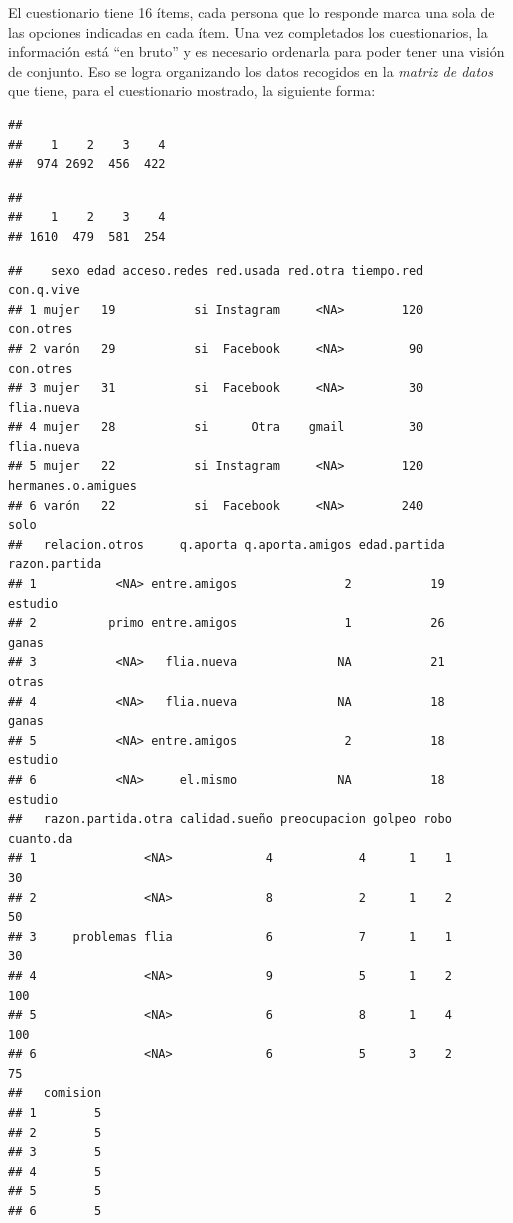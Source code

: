 \documentclass[]{book}
\begin{document}
El cuestionario tiene 16 ítems, cada persona que lo responde marca una sola de las opciones indicadas en cada ítem. Una vez completados los cuestionarios, la información está ``en bruto'' y es necesario ordenarla para poder tener una visión de conjunto. Eso se logra organizando los datos recogidos en la \emph{matriz de datos} que tiene, para el cuestionario mostrado, la siguiente forma:

\begin{verbatim}
## 
##    1    2    3    4 
##  974 2692  456  422
\end{verbatim}

\begin{verbatim}
## 
##    1    2    3    4 
## 1610  479  581  254
\end{verbatim}

\begin{verbatim}
##    sexo edad acceso.redes red.usada red.otra tiempo.red         con.q.vive
## 1 mujer   19           si Instagram     <NA>        120          con.otres
## 2 varón   29           si  Facebook     <NA>         90          con.otres
## 3 mujer   31           si  Facebook     <NA>         30         flia.nueva
## 4 mujer   28           si      Otra    gmail         30         flia.nueva
## 5 mujer   22           si Instagram     <NA>        120 hermanes.o.amigues
## 6 varón   22           si  Facebook     <NA>        240               solo
##   relacion.otros     q.aporta q.aporta.amigos edad.partida razon.partida
## 1           <NA> entre.amigos               2           19       estudio
## 2          primo entre.amigos               1           26         ganas
## 3           <NA>   flia.nueva              NA           21         otras
## 4           <NA>   flia.nueva              NA           18         ganas
## 5           <NA> entre.amigos               2           18       estudio
## 6           <NA>     el.mismo              NA           18       estudio
##   razon.partida.otra calidad.sueño preocupacion golpeo robo cuanto.da
## 1               <NA>             4            4      1    1        30
## 2               <NA>             8            2      1    2        50
## 3     problemas flia             6            7      1    1        30
## 4               <NA>             9            5      1    2       100
## 5               <NA>             6            8      1    4       100
## 6               <NA>             6            5      3    2        75
##   comision
## 1        5
## 2        5
## 3        5
## 4        5
## 5        5
## 6        5
\end{verbatim}
\end{document}
